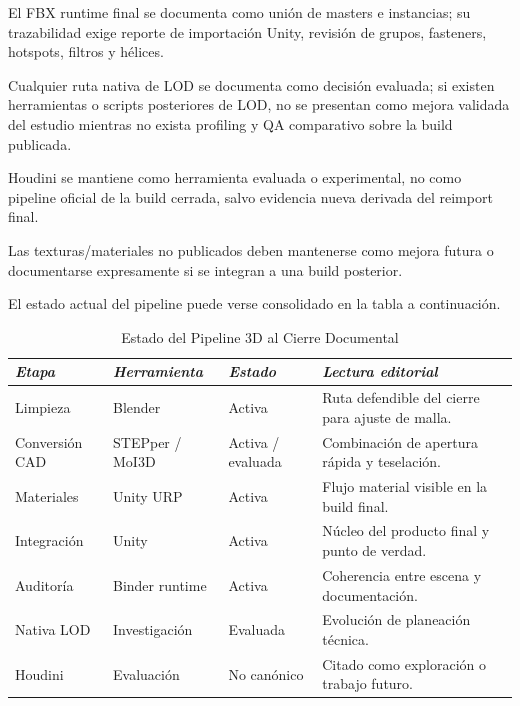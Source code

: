 El FBX runtime final se documenta como unión de masters e instancias; su trazabilidad exige reporte de importación Unity, revisión de grupos, fasteners, hotspots, filtros y hélices.

Cualquier ruta nativa de LOD se documenta como decisión evaluada; si existen herramientas o scripts posteriores de LOD, no se presentan como mejora validada del estudio mientras no exista profiling y QA comparativo sobre la build publicada.

Houdini se mantiene como herramienta evaluada o experimental, no como pipeline oficial de la build cerrada, salvo evidencia nueva derivada del reimport final.

Las texturas/materiales no publicados deben mantenerse como mejora futura o documentarse expresamente si se integran a una build posterior.

El estado actual del pipeline puede verse consolidado en la tabla a continuación.

\begin{table}[htbp]
    \caption*{Estado del Pipeline 3D al Cierre Documental}
    \begin{tabularx}{\textwidth}{p{2.8cm}p{2.8cm}p{2.2cm}X}
        \hline
        \textit{Etapa} & \textit{Herramienta} & \textit{Estado} & \textit{Lectura editorial} \\ \hline
        Limpieza & Blender & Activa & Ruta defendible del cierre para ajuste de malla. \\
        Conversión CAD & STEPper / MoI3D & Activa / evaluada & Combinación de apertura rápida y teselación. \\
        Materiales & Unity URP & Activa & Flujo material visible en la build final. \\
        Integración & Unity & Activa & Núcleo del producto final y punto de verdad. \\
        Auditoría & Binder runtime & Activa & Coherencia entre escena y documentación. \\
        Nativa LOD & Investigación & Evaluada & Evolución de planeación técnica. \\
        Houdini & Evaluación & No canónico & Citado como exploración o trabajo futuro. \\ \hline
    \end{tabularx}
\end{table}

